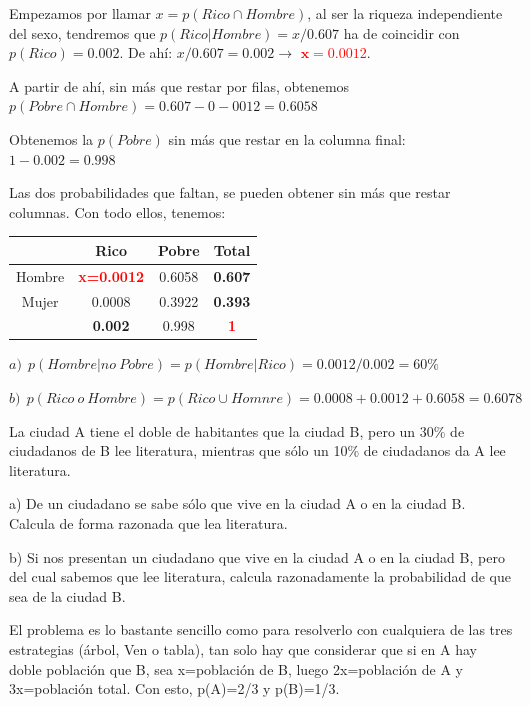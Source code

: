 Empezamos por llamar $x=p(Rico\cap Hombre)$, al ser la riqueza independiente del sexo, tendremos que $p(Rico|Hombre)=x/0.607$ ha de coincidir con $p(Rico)=0.002$. De ahí: $x/0.607=0.002 \to$ \textcolor{red}{$\boldsymbol{x=0.0012}$}.

A partir de ahí, sin más que restar por filas, obtenemos $p(Pobre\cap Hombre)=0.607-0-0012=0.6058$

Obtenemos la $p(Pobre)$ sin más que restar en la columna final: $1-0.002=0.998$

Las dos probabilidades que faltan, se pueden obtener sin más que restar columnas. Con todo ellos, tenemos:

\begin{table}[H]
\centering
\begin{tabular}{c|c|c|c|}
\cline{2-4}
 & Rico & Pobre & Total \\ \hline
\multicolumn{1}{|c|}{Hombre} & \textcolor{red}{\textbf{x=0.0012}} & 0.6058 & \textbf{0.607} \\ \hline
\multicolumn{1}{|c|}{Mujer} & 0.0008 & 0.3922 & \textbf{0.393} \\ \hline
 & \textbf{0.002} & 0.998 & \textcolor{red}{\textbf{1}} \\ \cline{2-4} 
\end{tabular}
\end{table}

$a)\ \ p(Hombre|no\ Pobre)=p(Hombre|Rico)=0.0012/0.002=60\%$

$b)\ \ p(Rico \ o \ Hombre)=p(Rico\cup Homnre)=0.0008+0.0012+0.6058=0.6078$



\vspace{5mm}
\begin{ejemplo}
\begin{ejer}
La ciudad A tiene el doble de habitantes que la ciudad B, pero un 30\% de ciudadanos de B lee literatura, mientras que sólo un 10\% de ciudadanos da A lee literatura. 

a)  De un ciudadano se sabe sólo que vive en la ciudad A o en la ciudad B.  Calcula de forma razonada que lea literatura.

b)  Si nos presentan un ciudadano que vive en la ciudad A o en la ciudad B, pero del cual sabemos que lee literatura, calcula razonadamente la probabilidad de que sea de la ciudad B. 	
\end{ejer}
\end{ejemplo}
El problema es lo bastante sencillo como para resolverlo con cualquiera de las tres estrategias (árbol, Ven o tabla), tan solo hay que considerar que si en A hay doble población que B, sea x=población de B, luego 2x=población de A y 3x=población total. Con esto, p(A)=2/3 y p(B)=1/3.

